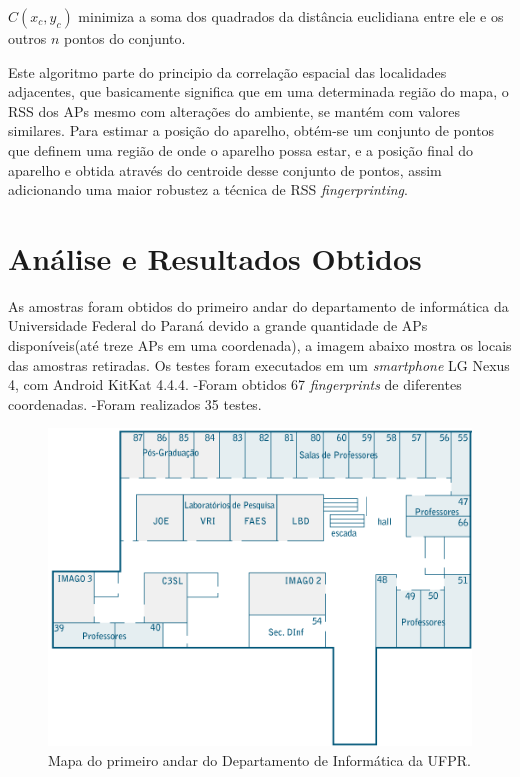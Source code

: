   $C(x_c,y_c)$ minimiza a soma dos quadrados da distância euclidiana entre ele e os outros $n$ pontos do conjunto\cite{centroid}.
  
      Este algoritmo parte do principio da correlação espacial das localidades adjacentes\cite{fingerPrint2}, 
  que basicamente significa que em uma determinada região do mapa, o RSS dos APs
  mesmo com alterações do ambiente, se mantém com valores similares. Para estimar a posição do aparelho, 
  obtém-se um conjunto de pontos que definem uma região de onde o aparelho possa estar, e a posição final do aparelho 
  e obtida através do centroide desse conjunto de pontos, assim adicionando uma maior robustez 
  a técnica de RSS \textit{fingerprinting}.
  
  \section{Análise e Resultados Obtidos}
  
  As amostras foram obtidos do primeiro andar do departamento de informática da Universidade Federal do Paraná devido a 
  grande quantidade de APs disponíveis(até treze APs em uma coordenada), a imagem abaixo mostra os locais das amostras retiradas.
  Os testes foram executados em um \textit{smartphone} LG Nexus 4, com Android KitKat 4.4.4. 
  -Foram obtidos 67 \textit{fingerprints} de diferentes coordenadas.
  -Foram realizados 35 testes.
  
  
   \begin{figure}[hbt]
  \centering
  \includegraphics[scale=0.9]{images/mapadinf_andar1_492x327.png}
  \caption{Mapa do primeiro andar do Departamento de Informática da UFPR.}
  \label{fig:mapaDinf}
  \end{figure}
     \clearpage
